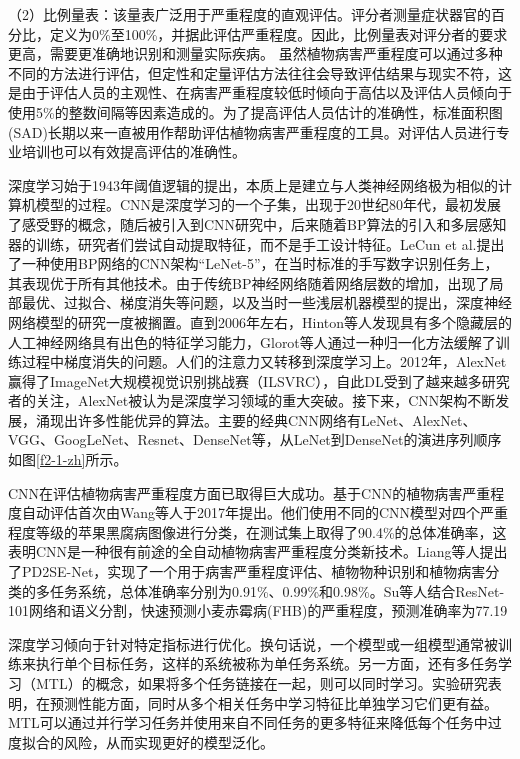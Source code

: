 （2）比例量表：该量表广泛用于严重程度的直观评估。评分者测量症状器官的百分比，定义为0\%至100\%，并据此评估严重程度。因此，比例量表对评分者的要求更高，需要更准确地识别和测量实际疾病。
虽然植物病害严重程度可以通过多种不同的方法进行评估，但定性和定量评估方法往往会导致评估结果与现实不符，这是由于评估人员的主观性、在病害严重程度较低时倾向于高估以及评估人员倾向于使用5\%的整数间隔等因素造成的。为了提高评估人员估计的准确性，标准面积图(SAD)长期以来一直被用作帮助评估植物病害严重程度的工具。对评估人员进行专业培训也可以有效提高评估的准确性。


深度学习始于1943年阈值逻辑的提出，本质上是建立与人类神经网络极为相似的计算机模型的过程。CNN是深度学习的一个子集，出现于20世纪80年代，最初发展了感受野的概念，随后被引入到CNN研究中，后来随着BP算法的引入和多层感知器的训练，研究者们尝试自动提取特征，而不是手工设计特征。LeCun et al.提出了一种使用BP网络的CNN架构“LeNet-5”，在当时标准的手写数字识别任务上，其表现优于所有其他技术。由于传统BP神经网络随着网络层数的增加，出现了局部最优、过拟合、梯度消失等问题，以及当时一些浅层机器模型的提出，深度神经网络模型的研究一度被搁置。直到2006年左右，Hinton等人发现具有多个隐藏层的人工神经网络具有出色的特征学习能力，Glorot等人通过一种归一化方法缓解了训练过程中梯度消失的问题。人们的注意力又转移到深度学习上。2012年，AlexNet赢得了ImageNet大规模视觉识别挑战赛（ILSVRC），自此DL受到了越来越多研究者的关注，AlexNet被认为是深度学习领域的重大突破。接下来，CNN架构不断发展，涌现出许多性能优异的算法。主要的经典CNN网络有LeNet、AlexNet、VGG、GoogLeNet、Resnet、DenseNet等，从LeNet到DenseNet的演进序列顺序如图\ref{f2-1-zh}所示。


CNN在评估植物病害严重程度方面已取得巨大成功。基于CNN的植物病害严重程度自动评估首次由Wang等人于2017年提出。他们使用不同的CNN模型对四个严重程度等级的苹果黑腐病图像进行分类，在测试集上取得了90.4\%的总体准确率，这表明CNN是一种很有前途的全自动植物病害严重程度分类新技术。Liang等人提出了PD2SE-Net，实现了一个用于病害严重程度评估、植物物种识别和植物病害分类的多任务系统，总体准确率分别为0.91\%、0.99\%和0.98\%。Su等人结合ResNet-101网络和语义分割，快速预测小麦赤霉病(FHB)的严重程度，预测准确率为77.19%

深度学习倾向于针对特定指标进行优化。换句话说，一个模型或一组模型通常被训练来执行单个目标任务，这样的系统被称为单任务系统。另一方面，还有多任务学习（MTL）的概念，如果将多个任务链接在一起，则可以同时学习。实验研究表明，在预测性能方面，同时从多个相关任务中学习特征比单独学习它们更有益。MTL可以通过并行学习任务并使用来自不同任务的更多特征来降低每个任务中过度拟合的风险，从而实现更好的模型泛化。

